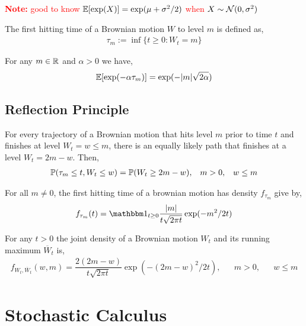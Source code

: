 \documentclass[12pt]{article}
\newcommand{\note}[1]{\textcolor{red}{\textbf{Note:} #1}}
\begin{document}
\note{good to know \( \mathbb{E}[\exp(X)] = \exp(\mu + \sigma^2/2) \) when \( X\sim \mathcal{N}(0,\sigma^2) \)}

\begin{definition}
The first hitting time of a Brownian motion \( W \) to level \( m \) is defined as,
\begin{align*}
    \tau_m := \inf\{t \geq 0 : W_t = m\}
\end{align*}
\end{definition}

\begin{theorem}
For any \( m\in\mathbb{R} \) and \( \alpha > 0 \) we have,
\begin{align*}
    \mathbb{E}[\exp(-\alpha \tau_m)] = \exp(-|m| \sqrt{2\alpha})
\end{align*}
\end{theorem}

\subsection{Reflection Principle}
For every trajectory of a Brownian motion that hits level \( m \) prior to time \( t \) and finishes at level \( W_t = w \leq m \), there is an equally likely path that finishes at a level \( W_t = 2m-w  \). Then,
\begin{align*}
    \mathbb{P}(\tau_m \leq t, W_t\leq w) = \mathbb{P}(W_t \geq 2m-w), && m>0, && w\leq m
\end{align*}

\begin{theorem}
For all \( m\neq0 \), the first hitting time of a brownian motion has density \( f_{\tau_m} \) give by,
\begin{align*}
    f_{\tau_m}(t) = \bOne_{t\geq 0}\frac{|m|}{t\sqrt{2\pi t}} \exp(-m^2/2t)
\end{align*}
\end{theorem}

\begin{theorem}
For any \( t > 0 \) the joint density of a Brownian motion \( W_t \) and its running maximum \( \overline{W}_t \) is,
\begin{align*}
    f_{W_t,\overline{W}_t}(w,m) = \dfrac{2(2m-w)}{t\sqrt{2\pi t}}\exp(-(2m-w)^2/2t), && m>0, && w\leq m
\end{align*}
\end{theorem}

\section{Stochastic Calculus}
\end{document}
